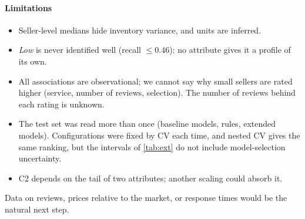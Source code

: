 \paragraph{Limitations}
\begin{itemize}
\item Seller-level medians hide inventory variance, and units are inferred.
\item \emph{Low} is never identified well (recall $\leq0.46$): no attribute gives it a profile of its own.
\item All associations are observational; we cannot say why small sellers are rated higher (service, number of reviews, selection). The number of reviews behind each rating is unknown.
\item The test set was read more than once (baseline models, rules, extended models). Configurations were fixed by CV each time, and nested CV gives the same ranking, but the intervals of \cref{tab:ext} do not include model-selection uncertainty.
\item C2 depends on the tail of two attributes; another scaling could absorb it.
\end{itemize}
Data on reviews, prices relative to the market, or response times would be the natural next step.
